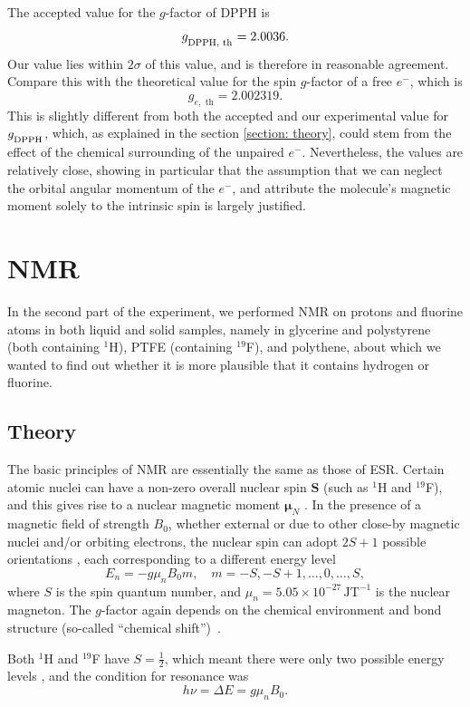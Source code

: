 \documentclass[a4paper]{jpconf}
\numberwithin{equation}{section}
\begin{document}
The accepted value for the $g$-factor of DPPH is
\[
	g_{\textsubscript{DPPH, th}} = 2.0036.
\]
Our value lies within $2\sigma$ of this value, and is therefore in reasonable agreement.
Compare this with the theoretical value for the spin $g$-factor of a free $e^-$, which is
\[
	g_{e,\text{ th}} = 2.002319.
\]
This is slightly different from both the accepted and our experimental value for $g_{\textsubscript{DPPH}}$, which, as explained in the section \ref{section: theory}, could stem from the effect of the chemical surrounding of the unpaired $e^-$. Nevertheless, the values are relatively close, showing in particular that the assumption that we can neglect the orbital angular momentum of the $e^-$, and attribute the molecule's magnetic moment solely to the intrinsic spin is largely justified.


\section{NMR} 
In the second part of the experiment, we performed NMR on protons and fluorine atoms in both liquid and solid samples, namely in glycerine and polystyrene (both containing ${}^1$H), PTFE (containing ${}^{19}$F), and polythene, about which we wanted to find out whether it is more plausible that it contains hydrogen or fluorine.
\subsection{Theory}

The basic principles of NMR are essentially the same as those of ESR. Certain atomic nuclei can have a non-zero overall nuclear spin $\mathbf{S}$ (such as ${}^1$H and ${}^{19}$F), and this gives rise to a nuclear magnetic moment $\bm{\mu}_N$ \cite{Smith, Gero}. In the presence of a magnetic field of strength $B_0$, whether external or due to other close-by magnetic nuclei and/or orbiting electrons, the nuclear spin can adopt $2S + 1$ possible orientations \cite{Gero, Ball}, each corresponding to a different energy level
\[
	E_n = -g \mu_n B_0 m, \quad m = -S, -S+1, \dots, 0, \dots, S, 
\] 
where $S$ is the spin quantum number, and $\mu_n = 5.05 \times 10^{-27} \, \si{\joule\tesla\tothe{-1}}$ is the nuclear magneton.
The $g$-factor again depends on the chemical environment and bond structure (so-called ``chemical shift'')~\cite{Ball}. 

Both ${}^1$H and ${}^{19}$F have $S = \tfrac{1}{2}$, which meant there were only two possible energy levels \cite{MacLaren, Gero}, and the condition for resonance was 
\begin{equation}\label{eqn: NMR resonance condition}
	h\nu = \Delta E = g \mu_n B_0.
\end{equation}
\end{document}
